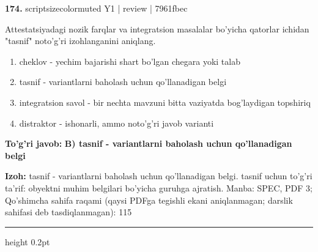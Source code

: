 \documentclass[10pt,a4paper]{article}
\begin{document}
{\bfseries\sffamily\color{ink} 174.} {scriptsizecolor{muted} Y1 | review | 7961fbec}
\par
Attestatsiyadagi nozik farqlar va integratsion masalalar bo'yicha qatorlar ichidan "tasnif" noto'g'ri izohlanganini aniqlang.
\begin{enumerate}[label=\Alph*),leftmargin=9mm]
\item cheklov - yechim bajarishi shart bo'lgan chegara yoki talab
\item tasnif - variantlarni baholash uchun qo'llanadigan belgi
\item integratsion savol - bir nechta mavzuni bitta vaziyatda bog'laydigan topshiriq
\item distraktor - ishonarli, ammo noto'g'ri javob varianti
\end{enumerate}
\begin{tcolorbox}[enhanced,breakable,colback=teal!4,colframe=teal!60!black,boxrule=0.45pt,arc=1.2mm,left=2.7mm,right=2.7mm,top=1.8mm,bottom=1.8mm,before skip=2mm,after skip=2mm]
{\bfseries\sffamily\color{teal}To'g'ri javob:} \textbf{B) tasnif - variantlarni baholash uchun qo'llanadigan belgi}
\par\smallskip
{\bfseries Izoh:} tasnif - variantlarni baholash uchun qo'llanadigan belgi. tasnif uchun to'g'ri ta'rif: obyektni muhim belgilari bo'yicha guruhga ajratish. Manba: SPEC, PDF 3; Qo'shimcha sahifa raqami (qaysi PDFga tegishli ekani aniqlanmagan; darslik sahifasi deb tasdiqlanmagan): 115
\end{tcolorbox}
\vspace{2mm}\hrule height 0.2pt\vspace{3mm}
\end{document}

